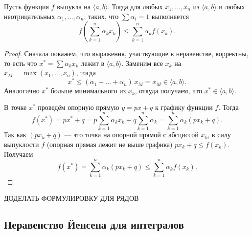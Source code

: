 \begin{theorem} \hypertarget{Йенсен-суммы}{}
	Пусть функция \(f\) выпукла на \(\langle a, b \rangle\). Тогда для любых \(x_1, \ldots, x_n\) из \(\langle a, b \rangle\) и любых неотрицательных \(\alpha_1, \ldots, \alpha_n\), таких, что \(\sum \alpha_i = 1\) выполняется \[
	f \left(\sum_{k=1}^n \alpha_k x_k \right) \leqslant \sum_{k=1}^n \alpha_k f(x_k). 
	\]
\end{theorem}
\begin{proof}
	Сначала покажем, что выражения, участвующие в неравенстве, корректны, то есть что \(x^* = \sum \alpha_k x_k\) лежит в  \(\langle a, b \rangle\). Заменим все \(x_k\) на \(x_M = \max(x_1, \ldots, x_n)\), тогда \[
	x^* \leqslant (\alpha_1 + \ldots + \alpha_n) \, x_M = x_M \in \langle a, b \rangle.
	\]
	Аналогично \(x^*\) больше минимального из \(x_k\), откуда получаем, что \(x^* \in \langle a, b \rangle\).
	
	В точке \(x^*\) проведём опорную прямую \(y = px + q\) к графику функции \(f\). Тогда \[
	f(x^*) = px^* + q = p \sum_{k=1}^n \alpha_k x_k + q \sum_{k=1}^n \alpha_k = \sum_{k=1}^n \alpha_k (px_k + q).
	\]
	Так как \((px_k + q)\) --- это точка на опорной прямой с абсциссой \(x_k\), в силу выпуклости \(f\) (опорная прямая лежит не выше графика) \(px_k + q \leqslant f(x_k)\). Получаем \[
	f(x^*) = \sum_{k=1}^n \alpha_k (px_k + q) \leqslant \sum_{k=1}^n \alpha_k f(x_k).
	\]
\end{proof}

ДОДЕЛАТЬ ФОРМУЛИРОВКУ ДЛЯ РЯДОВ

\subsection{Неравенство Йенсена для интегралов}

